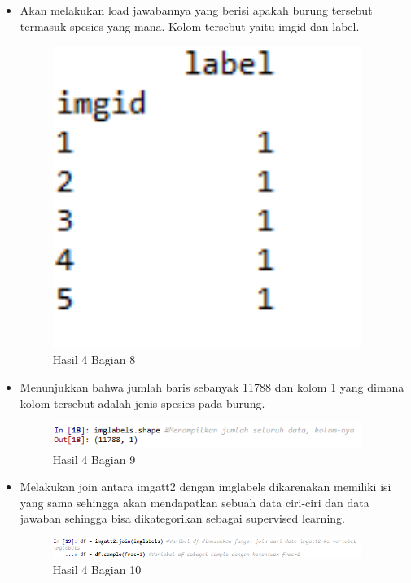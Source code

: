 \begin{itemize}
\item Akan melakukan load jawabannya yang berisi apakah burung tersebut termasuk spesies yang mana. Kolom tersebut yaitu imgid dan label.

\begin{figure}[H]
\centerline{\includegraphics[width=10cm]{figures/1174077/3/15.png}}
\caption{Hasil 4 Bagian 8}
\label{labelgambar}
\end{figure}

\item Menunjukkan bahwa jumlah baris sebanyak 11788 dan kolom 1 yang dimana kolom tersebut adalah jenis spesies pada burung.

\begin{figure}[H]
\centerline{\includegraphics[width=10cm]{figures/1174077/3/16.png}}
\caption{Hasil 4 Bagian 9}
\label{labelgambar}
\end{figure}

\item Melakukan join antara imgatt2 dengan imglabels dikarenakan memiliki isi yang sama sehingga akan mendapatkan sebuah data ciri-ciri dan data jawaban sehingga bisa dikategorikan sebagai supervised learning.

\begin{figure}[H]
\centerline{\includegraphics[width=10cm]{figures/1174077/3/17.png}}
\caption{Hasil 4 Bagian 10}
\label{labelgambar}
\end{figure}


\end{itemize}
